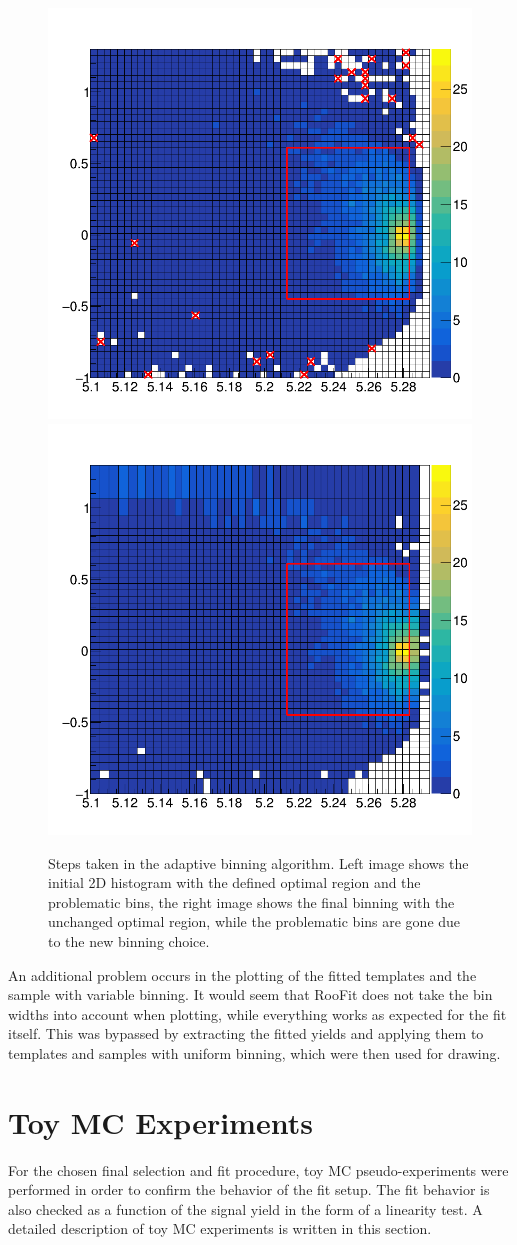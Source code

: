 \begin{figure}[H]
	\centering
	\captionsetup{width=0.8\linewidth}
	\includegraphics[width=0.49\linewidth]{fig/adaptive_1}
	\includegraphics[width=0.49\linewidth]{fig/adaptive_15}
	\caption{Steps taken in the adaptive binning algorithm. Left image shows the initial 2D histogram with the defined optimal region and the problematic bins, the right image shows the final binning with the unchanged optimal region, while the problematic bins are gone due to the new binning choice.}
	\label{fig:adapt}
\end{figure}

An additional problem occurs in the plotting of the fitted templates and the sample with variable binning. It would seem that RooFit does not take the bin widths into account when plotting, while everything works as expected for the fit itself. This was bypassed by extracting the fitted yields and applying them to templates and samples with uniform binning, which were then used for drawing.

\section{Toy MC Experiments}

For the chosen final selection and fit procedure, toy MC pseudo-experiments were performed in order to confirm the behavior of the fit setup. The fit behavior is also checked as a function of the signal yield in the form of a linearity test. A detailed description of toy MC experiments is written in this section.

